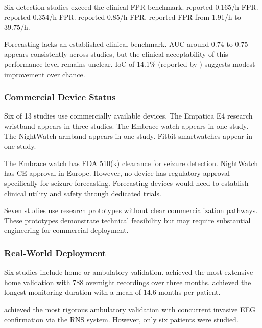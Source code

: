 Six detection studies exceed the clinical FPR benchmark. \textcite{dongTwoLayerEnsembleMethod2022} reported 0.165/h FPR. \textcite{wangDevelopmentWearableSeizure2025} reported 0.354/h FPR. \textcite{odeDevelopmentEpilepticSeizure2023} reported 0.85/h FPR. \textcite{reintjesECGBasedDetectionEpileptic2025} reported FPR from 1.91/h to 39.75/h.

Forecasting lacks an established clinical benchmark. AUC around 0.74 to 0.75 appears consistently across studies, but the clinical acceptability of this performance level remains unclear. IoC of 14.1\% (reported by \textcite{meiselMachineLearningWristband2020}) suggests modest improvement over chance.

\subsubsection{Commercial Device Status}

Six of 13 studies use commercially available devices. The Empatica E4 research wristband appears in three studies. The Embrace watch appears in one study. The NightWatch armband appears in one study. Fitbit smartwatches appear in one study.

The Embrace watch has FDA 510(k) clearance for seizure detection. NightWatch has CE approval in Europe. However, no device has regulatory approval specifically for seizure forecasting. Forecasting devices would need to establish clinical utility and safety through dedicated trials.

Seven studies use research prototypes without clear commercialization pathways. These prototypes demonstrate technical feasibility but may require substantial engineering for commercial deployment.

\subsubsection{Real-World Deployment}

Six studies include home or ambulatory validation. \textcite{dongTwoLayerEnsembleMethod2022} achieved the most extensive home validation with 788 overnight recordings over three months. \textcite{stirlingForecastingSeizureLikelihood2021} achieved the longest monitoring duration with a mean of 14.6 months per patient.

\textcite{nasseriAmbulatorySeizureForecasting2021} achieved the most rigorous ambulatory validation with concurrent invasive EEG confirmation via the RNS system. However, only six patients were studied.


